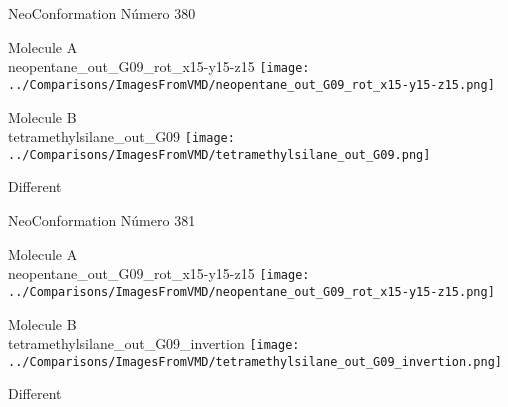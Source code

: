 \vtab[-3cm]
\begin{center}
{\large NeoConformation \tab Número 380}
\end{center}
\begin{multicols}{2}
\begin{center}
Molecule A \\ 
neopentane\_out\_G09\_rot\_x15-y15-z15
\texttt{[image: ../Comparisons/ImagesFromVMD/neopentane\_out\_G09\_rot\_x15-y15-z15.png]}
\\
\vtab

\columnbreak
Molecule B \\ 
tetramethylsilane\_out\_G09
\texttt{[image: ../Comparisons/ImagesFromVMD/tetramethylsilane\_out\_G09.png]}
\\
\vtab


\end{center}
\end{multicols}
\begin{center}
\textcolor{NavyBlue}{\Large Different}
\end{center}

 \newpage

\vtab[-3cm]
\begin{center}
{\large NeoConformation \tab Número 381}
\end{center}
\begin{multicols}{2}
\begin{center}
Molecule A \\ 
neopentane\_out\_G09\_rot\_x15-y15-z15
\texttt{[image: ../Comparisons/ImagesFromVMD/neopentane\_out\_G09\_rot\_x15-y15-z15.png]}
\\
\vtab

\columnbreak
Molecule B \\ 
tetramethylsilane\_out\_G09\_invertion
\texttt{[image: ../Comparisons/ImagesFromVMD/tetramethylsilane\_out\_G09\_invertion.png]}
\\
\vtab


\end{center}
\end{multicols}
\begin{center}
\textcolor{NavyBlue}{\Large Different}
\end{center}

 \newpage

